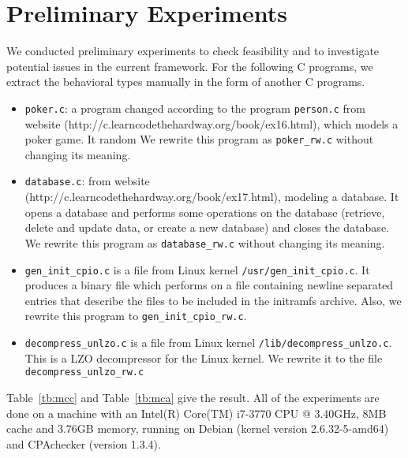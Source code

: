 \section{Preliminary Experiments}
\label{sec:experiment}


We conducted preliminary experiments to check feasibility and to
investigate potential issues in the current framework.  For the
following C programs, we extract the behavioral types manually in the
form of another C programs.
\begin{itemize}

\item \texttt{poker.c}: a program changed according to the program
  \texttt{person.c} from website
  (http://c.learncodethehardway.org/book/ex16.html), which models a
  poker game. It random  We rewrite this program as \texttt{poker\_rw.c} without
  changing its meaning.

\item \texttt{database.c}: from website
  (http://c.learncodethehardway.org/book/ex17.html), modeling a
  database. It opens a database and performs some operations on the
  database (retrieve, delete and update data, or create a new
  database) and closes the database. We rewrite this program as
  \texttt{database\_rw.c} without changing its meaning.
\item \texttt{gen\_init\_cpio.c} is a file from Linux kernel
  \texttt{/usr/gen\_init\_cpio.c}. It produces a binary file which
  performs on a file containing newline separated entries that
  describe the files to be included in the initramfs archive. Also, we
  rewrite this program to \texttt{gen\_init\_cpio\_rw.c}.
  \item \texttt{decompress\_unlzo.c} is a file from Linux kernel
    \texttt{/lib/decompress\_unlzo.c}. This is a LZO decompressor for
    the Linux kernel. We rewrite it to the file
    \texttt{decompress\_unlzo\_rw.c}
\end{itemize}

Table~\ref{tb:mcc} and Table~\ref{tb:mca} give the result.  All of the
experiments are done on a machine with an Intel(R) Core(TM) i7-3770
CPU @ 3.40GHz, 8MB cache and 3.76GB memory, running on Debian (kernel
version 2.6.32-5-amd64) and CPAchecker (version 1.3.4).

